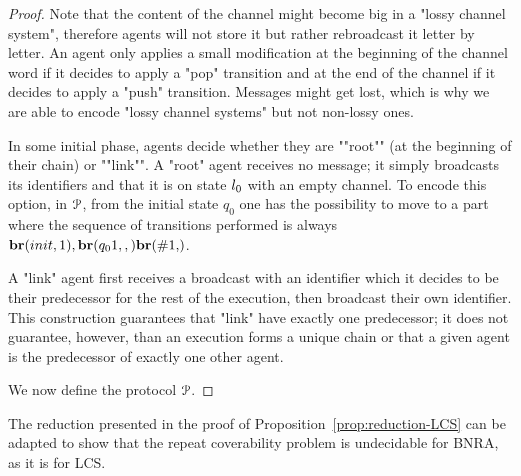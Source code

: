 \begin{proof}
Note that the content of the channel might become big in a "lossy channel system", therefore agents will not store it but rather rebroadcast it letter by letter. An agent only applies a small modification at the beginning of the channel word if it decides to apply a "pop" transition and at the end of the channel if it decides to apply a "push" transition. Messages might get lost, which is why we are able to encode "lossy channel systems" but not non-lossy ones.

In some initial phase, agents decide whether they are ""root"" (at the beginning of their chain) or ""link"". A "root" agent receives no message; it simply broadcasts its identifiers and that it is on state $l_0$ with an empty channel. To encode this option, in $\mathcal{P}$, from the initial state $q_0$ one has the possibility to move to a part where the sequence of transitions performed is always $\br{\mathsf{init}}{1}, \br{\mathsf{q_0}{1}}, \br{\mathsf{\#}{1}}$. 
 
A "link" agent first receives a broadcast with an identifier which it decides to be their predecessor for the rest of the execution, then broadcast their own identifier. This construction guarantees that "link" have exactly one predecessor; it does not guarantee, however, than an execution forms a unique chain or that a given agent is the predecessor of exactly one other agent. 

We now define the protocol $\mathcal{P}$. 


\end{proof}
\fi

\begin{remark}
	The reduction presented in the proof of Proposition~\ref{prop:reduction-LCS} can be adapted to show that the repeat coverability problem is undecidable for BNRA, as it is for LCS.
\end{remark}
